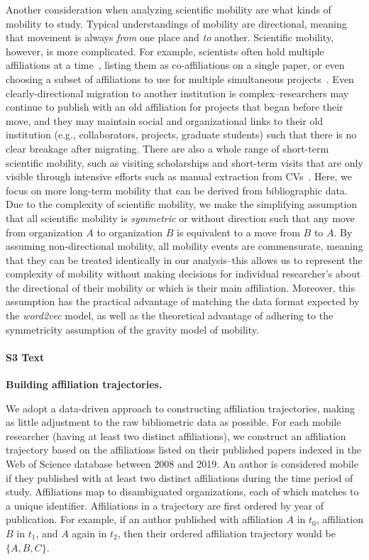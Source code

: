 \documentclass[12pt]{article} %
\begin{document}
Another consideration when analyzing scientific mobility are what kinds of mobility to study. 
Typical understandings of mobility are directional, meaning that movement is always \textit{from} one place and \textit{to} another. 
Scientific mobility, however, is more complicated.
For example, scientists often hold multiple affiliations at a time~\autocite{markova2016synchronous}, listing them as co-affiliations on a single paper, or even choosing a subset of affiliations to use for multiple simultaneous projects~\autocite{robinson2019mobility}.
Even clearly-directional migration to another institution is complex--researchers may continue to publish with an old affiliation for projects that began before their move, and they may maintain social and organizational links  to their old institution (e.g., collaborators, projects, graduate students) such that there is no clear breakage after migrating. 
There are also a whole range of short-term scientific mobility, such as visiting scholarships and short-term visits that are only visible through intensive efforts such as manual extraction from CVs~\autocite{woolley2009cv, sandstrom2009cv, canibano2011temporary}.
Here, we focus on more long-term mobility that can be derived from bibliographic data. 
Due to the complexity of scientific mobility, we make the simplifying assumption that all scientific mobility is \textit{symmetric} or without direction such that any move from organization $A$ to organization $B$ is equivalent to a move from $B$ to $A$. 
By assuming non-directional mobility, all mobility events are commensurate, meaning that they can be treated identically in our analysis--this allows us to represent the complexity of mobility without making decisions for individual researcher's about the directional of their mobility or which is their main affiliation.
Moreover, this assumption has the practical advantage of matching the data format expected by the \textit{word2vec} model, as well as the theoretical advantage of adhering to the symmetricity assumption of the gravity model of mobility. 


%
\paragraph*{S3 Text}
\label{si:text:mobility_traj}
{\bf Building affiliation trajectories.}

We adopt a data-driven approach to constructing affiliation trajectories, making as little adjustment to the raw bibliometric data as possible. 
For each mobile researcher (having at least two distinct affiliations), we construct an affiliation trajectory based on the affiliations listed on their published papers indexed in the Web of Science database between 2008 and 2019. 
An author is considered mobile if they published with at least two distinct affiliations during the time period of study. 
Affiliations map to disambiguated organizations, each of which matches to a unique identifier. 
Affiliations in a trajectory are first ordered by year of publication.
For example, if an author published with affiliation $A$ in $t_{0}$, affiliation $B$ in $t_{1}$, and $A$ again in $t_{2}$, then their ordered affiliation trajectory would be $\{A, B, C\}$. 
\end{document}
